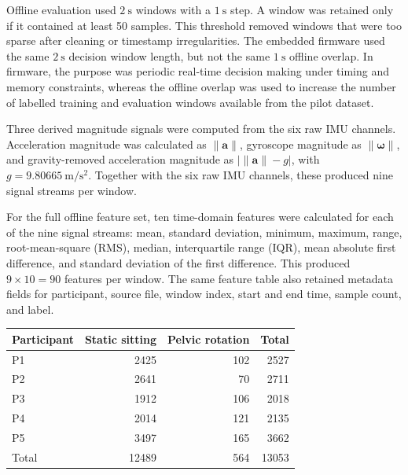 Offline evaluation used \(2~\si{\second}\) windows with a \(1~\si{\second}\) step. A window was retained only if it contained at least 50 samples. This threshold removed windows that were too sparse after cleaning or timestamp irregularities. The embedded firmware used the same \(2~\si{\second}\) decision window length, but not the same \(1~\si{\second}\) offline overlap. In firmware, the purpose was periodic real-time decision making under timing and memory constraints, whereas the offline overlap was used to increase the number of labelled training and evaluation windows available from the pilot dataset.

Three derived magnitude signals were computed from the six raw IMU channels. Acceleration magnitude was calculated as \(\lVert \mathbf{a} \rVert\), gyroscope magnitude as \(\lVert \boldsymbol{\omega} \rVert\), and gravity-removed acceleration magnitude as \(\left|\lVert \mathbf{a} \rVert - g\right|\), with \(g=9.80665~\si{\meter\per\second\squared}\). Together with the six raw IMU channels, these produced nine signal streams per window.

For the full offline feature set, ten time-domain features were calculated for each of the nine signal streams: mean, standard deviation, minimum, maximum, range, root-mean-square (RMS), median, interquartile range (IQR), mean absolute first difference, and standard deviation of the first difference. This produced \(9 \times 10 = 90\) features per window. The same feature table also retained metadata fields for participant, source file, window index, start and end time, sample count, and label.

\begin{center}
    \small
    \label{tab:objective3_window_counts}
    \begin{tabularx}{\linewidth}{@{}lrrr@{}}
        \toprule
        Participant & Static sitting & Pelvic rotation & Total \\
        \midrule
        P1 & 2425 & 102 & 2527 \\
        P2 & 2641 & 70 & 2711 \\
        P3 & 1912 & 106 & 2018 \\
        P4 & 2014 & 121 & 2135 \\
        P5 & 3497 & 165 & 3662 \\
        \midrule
        Total & 12489 & 564 & 13053 \\
        \bottomrule
    \end{tabularx}
\end{center}

